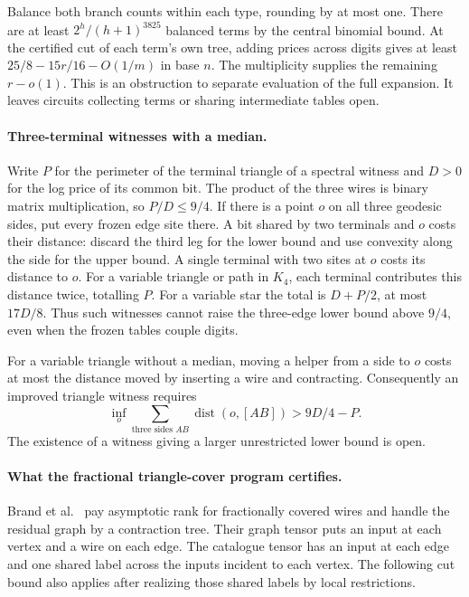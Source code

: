 \documentclass[11pt,letterpaper]{article}
\begin{document}
Balance both branch counts within each type, rounding by at most one.
There are at least \(2^h/(h+1)^{3825}\) balanced terms by the central
binomial bound. At the certified cut of each term's own tree, adding
prices across digits gives at least \(25/8-15r/16-O(1/m)\) in base
\(n\). The multiplicity supplies the remaining \(r-o(1)\). This is
an obstruction to separate evaluation of the full expansion. It leaves
circuits collecting terms or sharing intermediate tables open.

\paragraph{Three-terminal witnesses with a median.}
Write \(P\) for the perimeter of the terminal triangle of a spectral
witness and \(D>0\) for the log price of its common bit. The product
of the three wires is binary matrix multiplication, so \(P/D\le9/4\).
If there is a point \(o\) on all three geodesic sides, put every frozen
edge site there. A bit shared by two terminals and \(o\) costs their
distance: discard the third leg for the lower bound and use convexity
along the side for the upper bound. A single terminal with two sites at
\(o\) costs its distance to \(o\). For a variable triangle or path in
\(K_4\), each terminal contributes this distance twice, totalling \(P\).
For a variable star the total is \(D+P/2\), at most \(17D/8\).
Thus such witnesses cannot raise the three-edge lower bound above \(9/4\),
even when the frozen tables couple digits.

For a variable triangle without a median, moving a helper from a side to
\(o\) costs at most the distance moved by inserting a wire and contracting.
Consequently an improved triangle witness requires
\[
 \inf_o\sum_{\text{three sides }AB}\operatorname{dist}(o,[AB])
       > 9D/4-P.
\]
The existence of a witness giving a larger unrestricted lower bound is open.

\paragraph{What the fractional triangle-cover program certifies.}
Brand et al.~\cite[Theorem~5 and Lemma~39]{beyond-bilinear} pay asymptotic
rank for fractionally covered wires and handle the residual graph by a
contraction tree. Their graph tensor puts an input at each vertex and a wire
on each edge. The catalogue tensor has an input at each edge and one shared
label across the inputs incident to each vertex. The following cut bound
also applies after realizing those shared labels by local restrictions.
\end{document}
